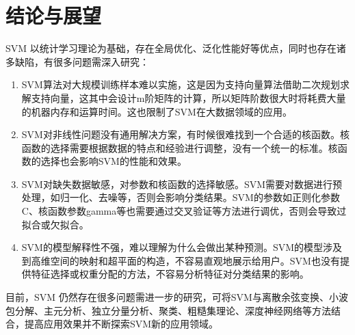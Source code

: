 \chapter{\hei 结论与展望}
SVM 以统计学习理论为基础，存在全局优化、泛化性能好等优点，同时也存在诸多缺陷，有很多问题需深入研究：
\begin{enumerate}
    \item SVM算法对大规模训练样本难以实施，这是因为支持向量算法借助二次规划求解支持向量，这其中会设计m阶矩阵的计算，所以矩阵阶数很大时将耗费大量的机器内存和运算时间。这也限制了SVM在大数据领域的应用。
    \item SVM对非线性问题没有通用解决方案，有时候很难找到一个合适的核函数。核函数的选择需要根据数据的特点和经验进行调整，没有一个统一的标准。核函数的选择也会影响SVM的性能和效果。
    \item SVM对缺失数据敏感，对参数和核函数的选择敏感。SVM需要对数据进行预处理，如归一化、去噪等，否则会影响分类结果。SVM的参数如正则化参数C、核函数参数gamma等也需要通过交叉验证等方法进行调优，否则会导致过拟合或欠拟合。
    \item SVM的模型解释性不强，难以理解为什么会做出某种预测。SVM的模型涉及到高维空间的映射和超平面的构造，不容易直观地展示给用户。SVM也没有提供特征选择或权重分配的方法，不容易分析特征对分类结果的影响。
\end{enumerate}

目前，SVM 仍然存在很多问题需进一步的研究，可将SVM与离散余弦变换、小波包分解、主元分析、独立分量分析、聚类、粗糙集理论、深度神经网络等方法结合\cite{张松兰2016支持向量机的算法及应用综述}，提高应用效果并不断探索SVM新的应用领域。
